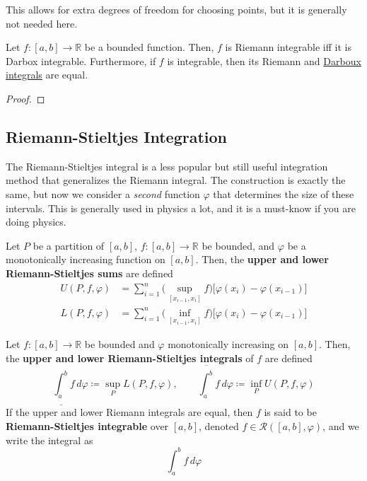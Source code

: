   This allows for extra degrees of freedom for choosing points, but it is generally not needed here. 

  \begin{theorem}
    \label{thm:equivalence-of-riemann-and-darboux-integrals}
    Let $f: [a, b] \to \mathbb{R}$ be a bounded function. Then, $f$ is Riemann integrable iff it is Darbox integrable. Furthermore, if $f$ is integrable, then its Riemann and \hyperref[def:riemann-integral]{Darboux integrals} are equal. 
  \end{theorem}
  \begin{proof}
    
  \end{proof}

\subsection{Riemann-Stieltjes Integration} 

  The Riemann-Stieltjes integral is a less popular but still useful integration method that generalizes the Riemann integral. The construction is exactly the same, but now we consider a \textit{second} function $\varphi$ that determines the size of these intervals. This is generally used in physics a lot, and it is a must-know if you are doing physics. 

  \begin{definition}
    \label{def:riemann-stieltjes-sums-with-respect-to-partition}
    Let $P$ be a partition of $[a, b]$, $f: [a, b] \to \mathbb{R}$ be bounded, and $\varphi$ be a monotonically increasing function on $[a, b]$. Then, the \textbf{upper and lower Riemann-Stieltjes sums} are defined 
    \begin{align}
      U(P, f, \varphi) & = \sum_{i=1}^n \Big( \sup_{[x_{i-1}, x_i]} f \Big) \big[ \varphi(x_i) - \varphi(x_{i-1}) \big] \\ 
      L(P, f, \varphi) & = \sum_{i=1}^n \Big( \inf_{[x_{i-1}, x_i]} f \Big) \big[ \varphi(x_i) - \varphi(x_{i-1}) \big] 
    \end{align}
  \end{definition}

  \begin{definition}
    \label{def:riemann-stieltjes-integral}
    Let $f: [a, b] \to \mathbb{R}$ be bounded and $\varphi$ monotonically increasing on $[a, b]$. Then, the \textbf{upper and lower Riemann-Stieltjes integrals} of $f$ are defined 
    \begin{equation}
      \underline{\int_a^b} f \,d\varphi \coloneqq \sup_P L(P, f, \varphi), \qquad \overline{\int_a^b} f \,d\varphi \coloneqq \inf_P U(P, f, \varphi)
    \end{equation}
    If the upper and lower Riemann integrals are equal, then $f$ is said to be \textbf{Riemann-Stieltjes integrable} over $[a, b]$, denoted $f \in \mathcal{R}([a, b], \varphi)$, and we write the integral as 
    \begin{equation}
      \int_a^b f \,d\varphi
    \end{equation}
  \end{definition}

